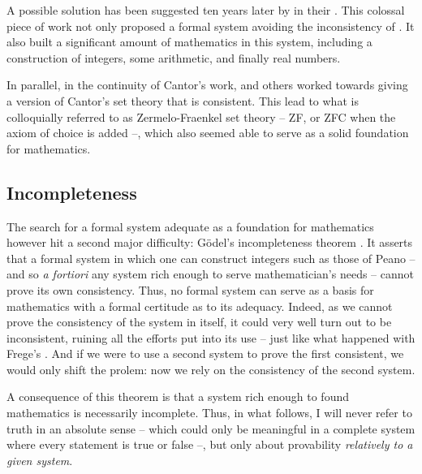 A possible solution has been suggested ten years later  by \citeauthor{Whitehead1913} in their
 . This colossal piece of work
not only proposed a formal system avoiding the inconsistency
of . It also built a significant amount
of mathematics in this system, including a construction of integers,
some arithmetic, and finally real numbers.

In parallel, in the continuity of Cantor’s work,  and others
worked towards giving a version of Cantor’s set theory that is consistent. This lead to what
is colloquially referred to as Zermelo-Fraenkel set theory – ZF, or ZFC when the
axiom of choice%
 is added –, which also seemed able to serve as a
solid foundation for mathematics.

\subsection{Incompleteness}

The search for a formal system adequate as a foundation for mathematics however hit a
second major difficulty: Gödel’s incompleteness theorem . It asserts
that a formal system in which one can construct integers such as those of Peano – and so
\textit{a fortiori} any system rich enough to serve mathematician’s needs – cannot
prove its own consistency.%
Thus, no formal system can serve as a basis for mathematics
with a formal certitude as to its adequacy.
Indeed, as we cannot prove the consistency of the system in itself, it could very well
turn out to be inconsistent, ruining all the efforts put into its use – just like what
happened with Frege’s . And if we were to use a second system
to prove the first consistent, we would only shift the prolem: now we rely on the
consistency of the second system.

A consequence of this theorem is that a system rich enough to found mathematics is
necessarily incomplete.%
Thus, in what follows, I will never refer to truth in an absolute sense – which could
only be meaningful in a complete system where every statement is true or false –, but
only about provability \emph{relatively to a given system}.

